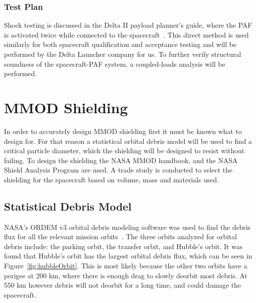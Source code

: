 \documentclass[paper=letter, fontsize=11pt]{scrartcl} %
\numberwithin{equation}{section} %
\numberwithin{figure}{section} %
\numberwithin{table}{section} %
\begin{document}
\subsubsection{Test Plan}

Shock testing is discussed in the Delta II payload planner's guide, where the PAF is activated twice while connected to the spacecraft~\cite{delta2}. This direct method is used similarly for both spacecraft qualification and acceptance testing and will be performed by the Delta Launcher company for us. To further verify structural soundness of the spacecraft-PAF system, a coupled-loads analysis will be performed.


\section{MMOD Shielding}
In order to accurately design MMOD shielding first it must be known what to design for. For that reason a statistical orbital debris model will be used to find a critical particle diameter, which the shielding will be designed to resist without failing. To design the shielding the NASA MMOD handbook, and the NASA Shield Analysis Program are used. A trade study is conducted to select the shielding for the spacecraft based on volume, mass and materials used.

\subsection{Statistical Debris Model}
NASA's ORDEM v3 orbital debris modeling software was used to find the debris flux for all the relevant mission orbits~\cite{debris_model}. The three orbits analyzed for orbital debris include: the parking orbit, the transfer orbit, and Hubble's orbit. It was found that Hubble's orbit has the largest orbital debris flux, which can be seen in Figure~\ref{fig:hubbleOrbit}. This is most likely because the other two orbits have a perigee at 200 km, where there is enough drag to slowly deorbit most debris. At 550 km however debris will not deorbit for a long time, and could damage the spacecraft.
\end{document}
